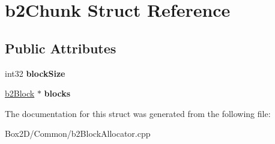 \hypertarget{structb2_chunk}{}\section{b2\+Chunk Struct Reference}
\label{structb2_chunk}
\subsection*{Public Attributes}
\begin{DoxyCompactItemize}
\item 
\mbox{\label{structb2_chunk_a731df6d026298426622990c251cf742a}} 
int32 {\bfseries block\+Size}
\item 
\mbox{\label{structb2_chunk_aa45617a36287b3dea2130c426cfd42d2}} 
\hyperlink{structb2_block}{b2\+Block} $\ast$ {\bfseries blocks}
\end{DoxyCompactItemize}


The documentation for this struct was generated from the following file\+:\begin{DoxyCompactItemize}
\item 
Box2\+D/\+Common/b2\+Block\+Allocator.\+cpp\end{DoxyCompactItemize}
